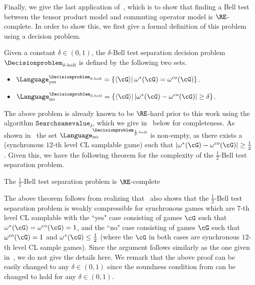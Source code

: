 Finally, we give the last application of~, which is to show that finding a Bell test between the tensor product model and commuting operator model is $\RE$-complete. In order to show this, we first give a formal definition of this problem using a decision problem. 
\begin{definition}
	Given a constant $\delta \in (0,1)$, the $\delta$-Bell test separation decision problem $\Decisionproblem_{\delta\text{-bell}}$ is defined by the following two sets. 
	\begin{itemize}
		\item $\Language^{\Decisionproblem_{\delta\text{-bell}}}_{\text{yes}} = \{\langle \cG\rangle | \, \omega^{*} (\cG) = \omega^{co}(\cG) \} $. 
		\item $\Language^{\Decisionproblem_{\delta\text{-bell}}}_{\text{no}} = \{\langle \cG \rangle |\, |\omega^{*} (\cG) - \omega^{co}(\cG)| \geq \delta \} $. 
	\end{itemize}
\end{definition} 

The above problem is already known to be $\RE$-hard prior to this work using the algorithm $\texttt{Searchsamevalue}_{\delta}$, which we give in~ below for completeness. As shown in~\cite[Theorem 12.10]{jiMIPRE2022a} the set $\Language^{\Decisionproblem_{\frac{1}{2}\text{-bell}}}_{\text{no}}$ is non-empty, as there exists a (synchronous $12$-th level CL samplable game) such that $ |\omega^{*} (\cG) - \omega^{co}(\cG)| \geq \frac{1}{2}$. Given this, we have the following theorem for the complexity of the $\frac{1}{2}$-Bell test separation problem.
\begin{theorem} \label{thm:samevalueREcomplete}
	The $\frac{1}{2}$-Bell test separation problem is $\RE$-complete
\end{theorem}

The above theorem follows from realizing that~ also shows that the $\frac{1}{2}$-Bell test separation problem is weakly compressible for synchronous games which are $7$-th level CL samplable with the ``yes" case consisting of games $\cG$ such that $\omega^*(\cG) = \omega^{co}(\cG) =1$, and the ``no"  case consisting of games $\cG$ such that $\omega^{co}(\cG) =1$ and $\omega^*(\cG) \leq \frac{1}{2}$ (where the $\cG$ in both cases are synchronous $12$-th level CL sample games). Since the argument follows similarly as the one given in~, we do not give the details here. We remark that the above proof can be easily changed to any $\delta \in (0,1)$ since the soundness condition from  can be changed to hold for any $\delta \in (0,1)$. 
 
